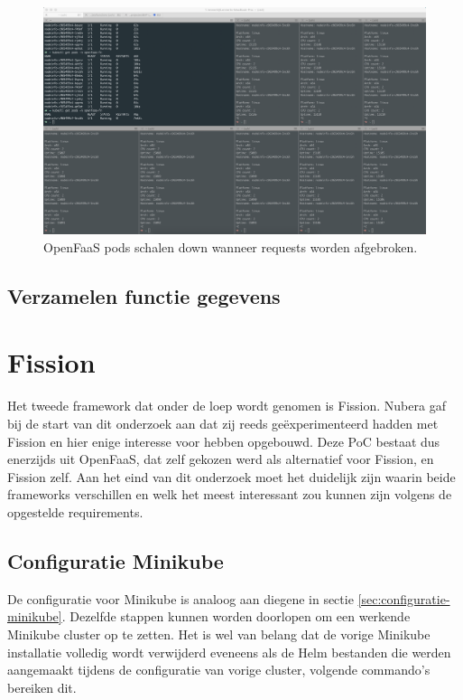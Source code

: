 \begin{figure}
    \includegraphics[width=1\textwidth]{img/openfaas-scalability-3.png}
    \caption{OpenFaaS pods schalen down wanneer requests worden afgebroken.}
    \label{fig:openfaas-scalability-3}  
\end{figure}

\subsection{Verzamelen functie gegevens}

\newpage
\section{Fission}
Het tweede framework dat onder de loep wordt genomen is Fission. Nubera gaf bij de start van dit onderzoek aan dat zij reeds geëxperimenteerd hadden met Fission en hier enige interesse voor hebben opgebouwd. Deze PoC bestaat dus enerzijds uit OpenFaaS, dat zelf gekozen werd als alternatief voor Fission, en Fission zelf. Aan het eind van dit onderzoek moet het duidelijk zijn waarin beide frameworks verschillen en welk het meest interessant zou kunnen zijn volgens de opgestelde requirements.

\subsection{Configuratie Minikube}
De configuratie voor Minikube is analoog aan diegene in sectie \ref{sec:configuratie-minikube}. Dezelfde stappen kunnen worden doorlopen om een werkende Minikube cluster op te zetten. Het is wel van belang dat de vorige Minikube installatie volledig wordt verwijderd eveneens als de Helm bestanden die werden aangemaakt tijdens de configuratie van vorige cluster, volgende commando's bereiken dit.

